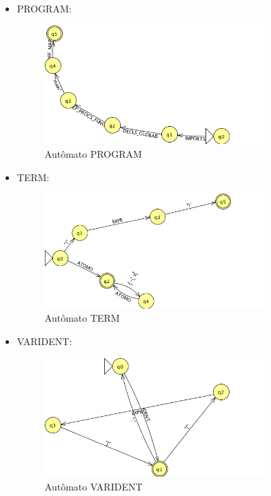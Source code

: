 \begin{itemize}
	\item PROGRAM:
	\begin{figure}[H]
		\centering 
		\includegraphics[width=0.8\textwidth]{images/submaquinas/PROGRAM.png}  
		\caption{Autômato PROGRAM}
	\end{figure}
	
	\item TERM:
	\begin{figure}[H]
		\centering 
		\includegraphics[width=0.8\textwidth]{images/submaquinas/TERM.png}  
		\caption{Autômato TERM}
	\end{figure}
	
	\item VARIDENT:
	\begin{figure}[H]
		\centering 
		\includegraphics[width=0.8\textwidth]{images/submaquinas/VARIDENT.png}  
		\caption{Autômato VARIDENT}
	\end{figure}

\end{itemize}
